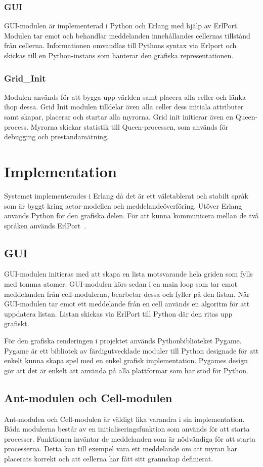 \documentclass[12pt]{article}
\begin{document}
\subsubsection{GUI}
GUI-modulen är implementerad i Python och Erlang med hjälp av ErlPort.
Modulen tar emot och behandlar meddelanden innehållandes cellernas tillstånd från cellerna.
Informationen omvandlas till Pythons syntax via Erlport och skickas till en Python-instans som hanterar den grafiska representationen.

\subsubsection{Grid\_Init}
Modulen används för att bygga upp världen samt placera alla celler och länka ihop dessa.
Grid Init modulen tilldelar även alla celler dess initiala attributer samt skapar,
placerar och startar alla myrorna. Grid init initierar även en Queen-process.
Myrorna skickar statistik till Queen-processen,
som används för debugging och prestandamätning.

\section{Implementation}\label{sec:implementation}
Systemet implementerades i Erlang då det är ett väletablerat och stabilt språk som är byggt kring actor-modellen och meddelandeöverföring.
Utöver Erlang används Python för den grafiska delen.
För att kunna kommunicera mellan de två språken används ErlPort~\cite{erlport}.

\subsection{GUI}
GUI-modulen initieras med att skapa en lista motsvarande hela griden som fylls med tomma atomer.
GUI-modulen körs sedan i en main loop som tar emot meddelanden från cell-modulerna,
bearbetar dessa och fyller på den listan. 
När GUI-modulen tar emot ett meddelande från en cell används en algoritm för att uppdatera listan.
Listan skickas via ErlPort till Python där den ritas upp grafiskt.

För den grafiska renderingen i projektet används Pythonbiblioteket Pygame.
Pygame är ett bibliotek av färdigutvecklade moduler till Python designade för att enkelt kunna skapa spel med en enkel grafisk implementation.
Pygames design gör att det är enkelt att använda på alla plattformar som har stöd för Python.

\subsection{Ant-modulen och Cell-modulen}
Ant-modulen och Cell-modulen är väldigt lika varandra i sin implementation.
Båda modulerna består av en initialiseringsfunktion som används för att starta processer.
Funktionen inväntar de meddelanden som är nödvändiga för att starta processerna.
Detta kan till exempel vara ett meddelande om att myran har placerats korrekt och att cellerna har fått sitt grannskap definierat.
\end{document}

